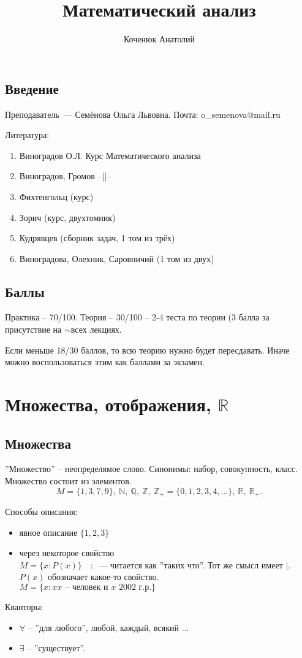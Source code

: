 \documentclass{book}
\author{Коченюк Анатолий}
\title{Математический анализ}
\newcommand\N{\ensuremath{\mathbb{N}}}
\newcommand\R{\ensuremath{\mathbb{R}}}
\newcommand\Z{\ensuremath{\mathbb{Z}}}
\newcommand\Q{\ensuremath{\mathbb{Q}}}
\theoremstyle{definition}
\begin{document}
    \maketitle
    \tableofcontents
    \newpage
    \section{Введение}
    Преподаватель~--- Семёнова Ольга Львовна. 
    Почта: o\_semenova@mail.ru

   
   Литература: \begin{enumerate}
       \item Виноградов О.Л. Курс Математического анализа
       \item Виноградов, Громов --||--
       \item Фихтенгольц (курс)
       \item Зорич (курс, двухтомник)
       \item Кудрявцев (сборник задач, 1 том из трёх)
       \item Виноградова, Олехник, Саровничий (1 том из двух)
   \end{enumerate}

    \section{Баллы}
    Практика -- 70/100.
    Теория -- 30/100 -- 2-4 теста по теории (3 балла за присутствие на $\sim $всех лекциях.

    Если меньше 18/30 баллов, то всю теорию нужно будет пересдавать. 
    Иначе можно воспользоваться этим как баллами за экзамен.

    \chapter{Множества, отображения, $\R$}
    \section{Множества}
    ''Множество'' -- неопределямое слово. 
    Синонимы: набор, совокупность, класс.
    Множество состоит из элементов. 
    \[M = \{1,3,7,9\},\ \N,\ \Q,\ \Z,\ \Z_+ = \{0,1,2,3,4,\ldots\},\ \R,\ \R_+.\]

    Способы описания:
    \begin{itemize}
        \item явное описание $\{1, 2, 3\}$
        \item через некоторое свойство\\ 
        $M = \{x: P(x)\}\quad :$~--- читается как ''таких что''. 
        Тот же смысл имеет $\mid$.
        $P(x)$ обозначает какое-то свойство.\\
        $M = \{x:x\text{$x$ -- человек и $x$ 2002 г.р.}\}$
    \end{itemize}
    Кванторы:
    \begin{itemize}
        \item $\forall $ -- ''для любого'', любой, каждый, всякий $\ldots$
        \item $\exists $ -- ''существует''.
    \end{itemize}
\end{document}
